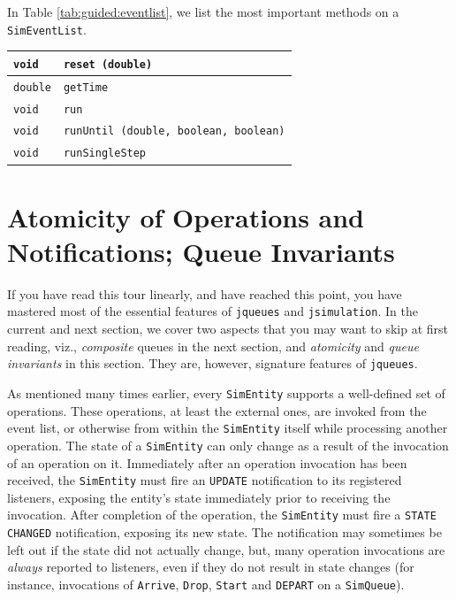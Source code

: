 \documentclass[12pt]{book}
\begin{document}
In Table \ref{tab:guided:eventlist},
  we list the most important methods
  on a \lstinline|SimEventList|.

\begin{table}[h]
\label{tab:guided:eventlist}
\caption{Important methods on a \texttt{SimEventList}.}
\begin{longtabu}{|l|l|}
\hline
\lstinline|void|   & \lstinline|reset (double)|
  \\ \hline
\lstinline|double| & \lstinline|getTime|
  \\ \hline
\lstinline|void|   & \lstinline|run|
  \\ \hline
\lstinline|void|   & \lstinline|runUntil (double, boolean, boolean)|
  \\ \hline
\lstinline|void|   & \lstinline|runSingleStep|
  \\ \hline
\end{longtabu}
\end{table}

\section{Atomicity of Operations and Notifications; Queue Invariants}
\label{sec:guided:atomicity}

If you have read this tour linearly,
  and have reached this point,
  you have mastered most of the essential features
  of \lstinline|jqueues| and \lstinline|jsimulation|.
In the current and next section,
  we cover two aspects that you may want to skip at first reading,
  viz., {\em composite\/} queues in the next section,
  and {\em atomicity\/} and {\em queue invariants\/} in this section.
They are, however, signature features of \lstinline|jqueues|.

As mentioned many times earlier,
  every \lstinline|SimEntity|
  supports a well-defined set of operations.
These operations, at least the external ones,
  are invoked from the event list,
  or otherwise from within the \lstinline|SimEntity| itself
  while processing another operation.
The state of a \lstinline|SimEntity| can only change
  as a result of the invocation of an operation on it.
Immediately after an operation invocation has been received,
  the \lstinline|SimEntity| must fire
  an \lstinline|UPDATE| notification to its registered
  listeners, exposing the entity's state
  immediately prior to receiving the invocation.
After completion of the operation,
  the \lstinline|SimEntity| must
  fire a \lstinline|STATE CHANGED| notification,
  exposing its new state.
The notification may sometimes be left out if the state
  did not actually change,
  but, many operation invocations are {\em always\/}
  reported to listeners, even if they do not result in state changes
  (for instance, invocations of \lstinline|Arrive|, \lstinline|Drop|,
   \lstinline|Start| and \lstinline|DEPART| on a \lstinline|SimQueue|).
\end{document}
